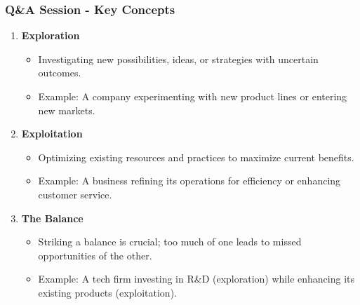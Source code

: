 \documentclass[aspectratio=169]{beamer}
\begin{document}
\begin{frame}[fragile]
    \frametitle{Q\&A Session - Key Concepts}
    \begin{enumerate}
        \item \textbf{Exploration} 
        \begin{itemize}
            \item Investigating new possibilities, ideas, or strategies with uncertain outcomes.
            \item Example: A company experimenting with new product lines or entering new markets.
        \end{itemize}
        
        \item \textbf{Exploitation}
        \begin{itemize}
            \item Optimizing existing resources and practices to maximize current benefits.
            \item Example: A business refining its operations for efficiency or enhancing customer service.
        \end{itemize}
        
        \item \textbf{The Balance}
        \begin{itemize}
            \item Striking a balance is crucial; too much of one leads to missed opportunities of the other.
            \item Example: A tech firm investing in R\&D (exploration) while enhancing its existing products (exploitation).
        \end{itemize}
    \end{enumerate}
\end{frame}
\end{document}
